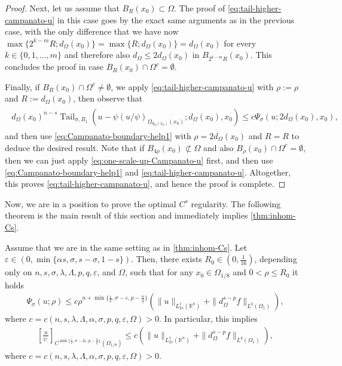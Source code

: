 \documentclass[11pt,reqno]{amsart}
\theoremstyle{plain}
\theoremstyle{definition}
\numberwithin{equation}{section}
\newcommand{\R}{\mathbb{R}}
\newcommand{\eps}{\varepsilon}
\newcommand{\1}{\mathbbm{1}}
\DeclareMathOperator{\tail}{Tail}
\begin{document}
\begin{proof}
Next, let us assume that $B_R(x_0) \subset \Omega$.
The proof of \eqref{eq:tail-higher-campanato-u} in this case goes by the exact same arguments as in the previous case, with the only difference that we have now $\max\{2^{k-m}R;d_{\Omega}(x_0)\} = \max\{R;d_{\Omega}(x_0)\} = d_{\Omega}(x_0)$ for every $k \in \{0, 1, \dots, m\}$ and therefore also $d_{\Omega} \le 2 d_{\Omega}(x_0)$ in $B_{2^{k-m}R}(x_0)$. This concludes the proof in case $B_R(x_0) \cap \Omega^c = \emptyset$.

Finally, if $B_R(x_0) \cap \Omega^c \not=\emptyset$, we apply \eqref{eq:tail-higher-campanato-u} with $\rho := \rho$ and $R := d_{\Omega}(x_0)$, then observe that
\begin{align}
\label{eq:one-scale-up-Campanato-u}
\begin{split}
d_{\Omega}(x_0)^{n-s} \tail_{\sigma,B_1}(u - \psi(u/\psi)_{\Omega_{d_{\Omega}(x_0)}(x_0)} ; d_{\Omega}(x_0), x_0) \le c \Psi_{\sigma}(u; 2d_\Omega(x_0), x_0),
\end{split}
\end{align}
and then use \eqref{eq:Campanato-boundary-help1} with $\rho = 2 d_{\Omega}(x_0)$ and $R = R$ to deduce the desired result. Note that if $B_{4\rho}(x_0) \not\subset \Omega$ and also $B_{\rho}(x_0) \cap \Omega^c = \emptyset$, then we can just apply \eqref{eq:one-scale-up-Campanato-u} first, and then use \eqref{eq:Campanato-boundary-help1} and \eqref{eq:tail-higher-campanato-u}. Altogether, this proves \eqref{eq:tail-higher-campanato-u}, and hence the proof is complete.
\end{proof}







Now, we are in a position to prove the optimal $C^s$ regularity. The following theorem is the main result of this section and immediately implies \autoref{thm:inhom-Cs}.


\begin{theorem}
\label{thm:Cs-inhom-flat}
Assume that we are in the same setting as in \autoref{thm:inhom-Cs}. Let $\eps \in (0,\min\{\alpha s, \sigma, s-\sigma,1-s\})$. Then, there exists $R_0 \in (0,\frac{1}{16})$, depending only on $n,s,\sigma,\lambda,\Lambda,p,q,\varepsilon$, and $\Omega$, such that for any $x_0 \in \Omega_{1/8}$ and $0 < \rho \leq R_0$ it holds
\begin{align}
\label{eq-Campanato-almost-optimal-Holder-inhom}
\Psi_\sigma(u;\rho) \le c \rho^{n+\min\{\frac{\varepsilon}{2},\sigma-\varepsilon, p - \frac{n}{q}\}} \left( \|u \|_{L^1_{2s}(\R^n)} + \| d^{s-p}_{\Omega} f\|_{L^q(\Omega_1)} \right),
\end{align}
where $c = c(n, s, \lambda, \Lambda, \alpha, \sigma, p, q, \varepsilon, \Omega) > 0$. In particular, this implies
\begin{align}\label{eq-u-psi-inhom}
\left[ \frac{u}{\psi_{\cdot}} \right]_{C^{\min\{ \frac{\eps}{2},\sigma-2\varepsilon,p-\frac{n}{q}\}}(\overline{\Omega_{1/8}})} \le c \left( \|u\|_{L^1_{2s}(\R^n)} + \|d^{s-p}_{\Omega} f\|_{L^q(\Omega_1)} \right),
\end{align}
where $c=c(n, s, \lambda, \Lambda, \alpha, \sigma, p, q, \varepsilon, \Omega) > 0$.
\end{theorem}
\end{document}
